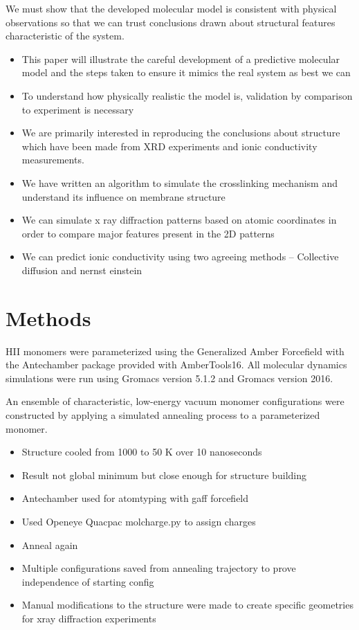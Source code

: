 \documentclass{article}
\begin{document}
	We must show that the developed molecular model is consistent with physical observations so that we can trust conclusions drawn about structural features characteristic of the system.
	\begin{itemize}
		\item This paper will illustrate the careful development of a predictive molecular model and the steps taken to ensure it mimics the real system as best we can 
		\item To understand how physically realistic the model is, validation by comparison to experiment is necessary
		\item We are primarily interested in reproducing the conclusions about structure which have been made from XRD experiments and ionic conductivity measurements.    
		\item We have written an algorithm to simulate the crosslinking mechanism and understand its influence on membrane structure
		\item We can simulate x ray diffraction patterns based on atomic coordinates in order to compare major features present in the 2D patterns
		\item We can predict ionic conductivity using two agreeing methods -- Collective diffusion and nernst einstein
	\end{itemize}
	
	\section{Methods}
	
	HII monomers were parameterized using the Generalized Amber Forcefield with the Antechamber package provided with AmberTools16. All molecular dynamics simulations were run using Gromacs version 5.1.2 and Gromacs version 2016.
	
	An ensemble of characteristic, low-energy vacuum monomer configurations were constructed by applying a simulated annealing process to a parameterized monomer.
	\begin{itemize}
		\item Structure cooled from 1000 to 50 K over 10 nanoseconds
		\item Result not global minimum but close enough for structure building
		\item Antechamber used for atomtyping with gaff forcefield
		\item Used Openeye Quacpac molcharge.py to assign charges
		\item Anneal again 
		\item Multiple configurations saved from annealing trajectory to prove independence of starting config
		\item Manual modifications to the structure were made to create specific geometries for xray diffraction experiments
	\end{itemize}
	
\end{document}
